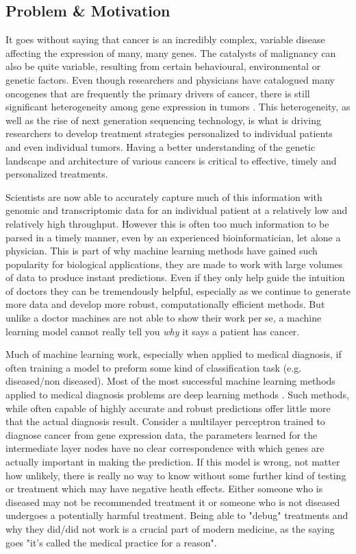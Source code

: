 \subsection{Problem \& Motivation}
It goes without saying that cancer is an incredibly complex, variable disease affecting the expression of many, many genes.
The catalysts of malignancy can also be quite variable, resulting from certain behavioural, environmental or genetic factors.
Even though researchers and physicians have catalogued many oncogenes that are frequently the primary drivers of cancer, there is still significant heterogeneity among gene expression in tumors \cite{onco}.
This heterogeneity, as well as the rise of next generation sequencing technology, is what is driving researchers to develop treatment strategies personalized to individual patients and even individual tumors.
Having a better understanding of the genetic landscape and architecture of various cancers is critical to effective, timely and personalized treatments.

Scientists are now able to accurately capture much of this information with genomic and transcriptomic data for an individual patient at a relatively low and relatively high throughput.
However this is often too much information to be parsed in a timely manner, even by an experienced bioinformatician, let alone a physician.
This is part of why machine learning methods have gained such popularity for biological applications, they are made to work with large volumes of data to produce instant predictions.
Even if they only help guide the intuition of doctors they can be tremendously helpful, especially as we continue to generate more data and develop more robust, computationally efficient methods.
But unlike a doctor machines are not able to show their work per se, a machine learning model cannot really tell you \emph{why} it says a patient has cancer.

Much of machine learning work, especially when applied to medical diagnosis, if often training a model to preform some kind of classification task (e.g. diseased/non diseased).
Most of the most successful machine learning methods applied to medical diagnosis problems are deep learning methods \cite{deep}.
Such methods, while often capable of highly accurate and robust predictions offer little more that the actual diagnosis result.
Consider a multilayer perceptron trained to diagnose cancer from gene expression data, the parameters learned for the intermediate layer nodes have no clear correspondence with which genes are actually important in making the prediction.
If this model is wrong, not matter how unlikely, there is really no way to know without some further kind of testing or treatment which may have negative heath effects.
Either someone who is diseased may not be recommended treatment it or someone who is not diseased undergoes a potentially harmful treatment.
Being able to "debug" treatments and why they did/did not work is a crucial part of modern medicine, as the saying goes "it's called the medical practice for a reason".

